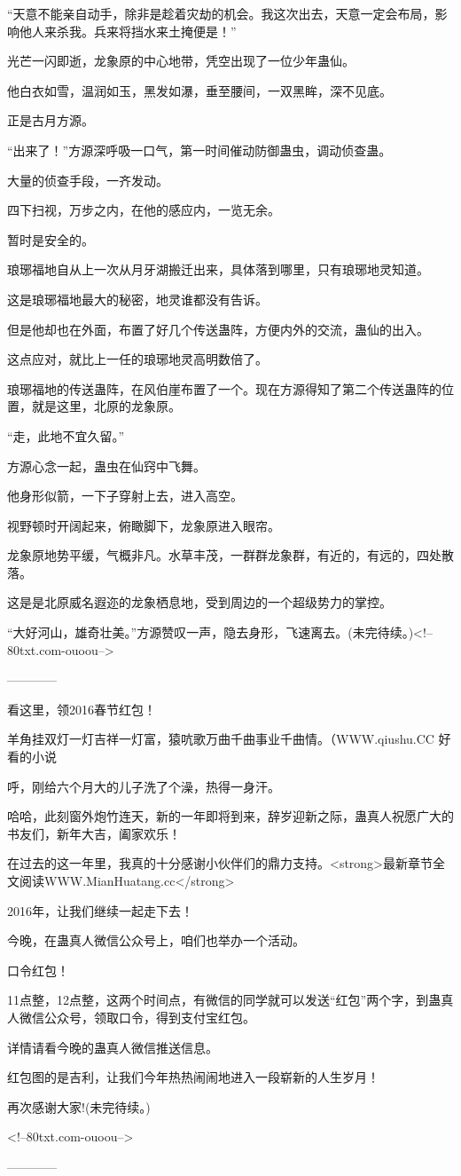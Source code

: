 \begin{this_body}
“天意不能亲自动手，除非是趁着灾劫的机会。我这次出去，天意一定会布局，影响他人来杀我。兵来将挡水来土掩便是！”

光芒一闪即逝，龙象原的中心地带，凭空出现了一位少年蛊仙。

他白衣如雪，温润如玉，黑发如瀑，垂至腰间，一双黑眸，深不见底。

正是古月方源。

“出来了！”方源深呼吸一口气，第一时间催动防御蛊虫，调动侦查蛊。

大量的侦查手段，一齐发动。

四下扫视，万步之内，在他的感应内，一览无余。

暂时是安全的。

琅琊福地自从上一次从月牙湖搬迁出来，具体落到哪里，只有琅琊地灵知道。

这是琅琊福地最大的秘密，地灵谁都没有告诉。

但是他却也在外面，布置了好几个传送蛊阵，方便内外的交流，蛊仙的出入。

这点应对，就比上一任的琅琊地灵高明数倍了。

琅琊福地的传送蛊阵，在风伯崖布置了一个。现在方源得知了第二个传送蛊阵的位置，就是这里，北原的龙象原。

“走，此地不宜久留。”

方源心念一起，蛊虫在仙窍中飞舞。

他身形似箭，一下子穿射上去，进入高空。

视野顿时开阔起来，俯瞰脚下，龙象原进入眼帘。

龙象原地势平缓，气概非凡。水草丰茂，一群群龙象群，有近的，有远的，四处散落。

这是是北原威名遐迩的龙象栖息地，受到周边的一个超级势力的掌控。

“大好河山，雄奇壮美。”方源赞叹一声，隐去身形，飞速离去。(未完待续。)<!--80txt.com-ouoou-->

------------

看这里，领2016春节红包！

羊角挂双灯一灯吉祥一灯富，猿吭歌万曲千曲事业千曲情。（WWW.qiushu.CC 好看的小说

呼，刚给六个月大的儿子洗了个澡，热得一身汗。

哈哈，此刻窗外炮竹连天，新的一年即将到来，辞岁迎新之际，蛊真人祝愿广大的书友们，新年大吉，阖家欢乐！

在过去的这一年里，我真的十分感谢小伙伴们的鼎力支持。<strong>最新章节全文阅读WWW.MianHuatang.cc</strong>

2016年，让我们继续一起走下去！

今晚，在蛊真人微信公众号上，咱们也举办一个活动。

口令红包！

11点整，12点整，这两个时间点，有微信的同学就可以发送“红包”两个字，到蛊真人微信公众号，领取口令，得到支付宝红包。

详情请看今晚的蛊真人微信推送信息。

红包图的是吉利，让我们今年热热闹闹地进入一段崭新的人生岁月！

再次感谢大家!(未完待续。)

<!--80txt.com-ouoou-->

------------

\end{this_body}

